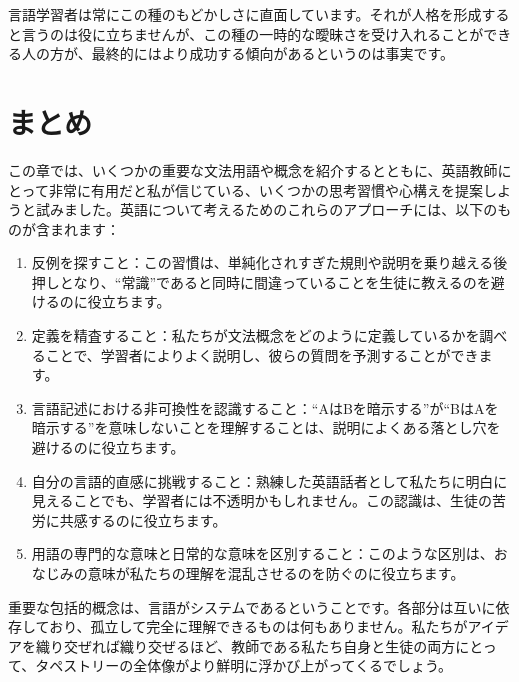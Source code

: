 言語学習者は常にこの種のもどかしさに直面しています。それが人格を形成すると言うのは役に立ちませんが、この種の一時的な曖昧さを受け入れることができる人の方が、最終的にはより成功する傾向があるというのは事実です。

\section{まとめ}
この章では、いくつかの重要な文法用語や概念を紹介するとともに、英語教師にとって非常に有用だと私が信じている、いくつかの思考習慣や心構えを提案しようと試みました。英語について考えるためのこれらのアプローチには、以下のものが含まれます：
\begin{enumerate}[noitemsep]
    \item 反例を探すこと：この習慣は、単純化されすぎた規則や説明を乗り越える後押しとなり、\enquote{常識}であると同時に間違っていることを生徒に教えるのを避けるのに役立ちます。
    \item 定義を精査すること：私たちが文法概念をどのように定義しているかを調べることで、学習者によりよく説明し、彼らの質問を予測することができます。
    \item 言語記述における非可換性を認識すること：\enquote{AはBを暗示する}が\enquote{BはAを暗示する}を意味しないことを理解することは、説明によくある落とし穴を避けるのに役立ちます。
    \item 自分の言語的直感に挑戦すること：熟練した英語話者として私たちに明白に見えることでも、学習者には不透明かもしれません。この認識は、生徒の苦労に共感するのに役立ちます。
    \item 用語の専門的な意味と日常的な意味を区別すること：このような区別は、おなじみの意味が私たちの理解を混乱させるのを防ぐのに役立ちます。
\end{enumerate}

重要な包括的概念は、言語がシステムであるということです。各部分は互いに依存しており、孤立して完全に理解できるものは何もありません。私たちがアイデアを織り交ぜれば織り交ぜるほど、教師である私たち自身と生徒の両方にとって、タペストリーの全体像がより鮮明に浮かび上がってくるでしょう。



